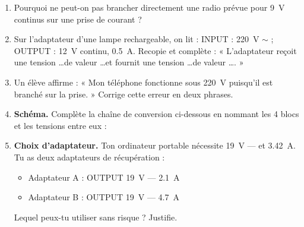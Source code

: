 \documentclass[11pt]{article}
\begin{document}
\begin{exercice}
\begin{enumerate}
\item Pourquoi ne peut-on pas brancher directement une radio prévue pour \SI{9}{V} continus sur une prise de courant ?
\item Sur l'adaptateur d'une lampe rechargeable, on lit : INPUT : \SI{220}{V} $\sim$ ; OUTPUT : \SI{12}{V} continu, \SI{0,5}{A}. Recopie et complète : « L'adaptateur reçoit une tension \ldots de valeur \ldots et fournit une tension \ldots de valeur \ldots. »
\item Un élève affirme : « Mon téléphone fonctionne sous \SI{220}{V} puisqu'il est branché sur la prise. » Corrige cette erreur en deux phrases.
\item \textbf{Schéma.} Complète la chaîne de conversion ci-dessous en nommant les 4 blocs et les tensions entre eux :
\begin{center}
\end{center}
\item \textbf{Choix d'adaptateur.} Ton ordinateur portable nécessite \SI{19}{V} --- et \SI{3,42}{A}. Tu as deux adaptateurs de récupération :
\begin{itemize}
\item Adaptateur A : OUTPUT \SI{19}{V} --- \SI{2,1}{A}
\item Adaptateur B : OUTPUT \SI{19}{V} --- \SI{4,7}{A}
\end{itemize}
Lequel peux-tu utiliser sans risque ? Justifie.
\end{enumerate}
\end{exercice}
\end{document}
